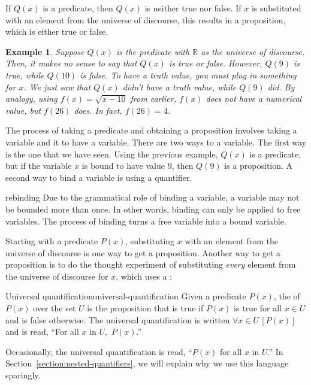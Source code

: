 \documentclass{book}
\newcounter{ekcounter}%
\theoremstyle{ekimcustom}
\newtheorem{example}[ekcounter]{Example}
\newcommand\defn[1]{{\color{blue}{\bf #1}}}
\begin{document}
If $Q(x)$ is a predicate, then $Q(x)$ is neither true nor false. If $x$ is substituted with an element from the universe of discourse, this results in a proposition, which is either true or false.
\begin{example}
Suppose $Q(x)$ is the predicate  with $\mathbb{R}$ as the universe of discourse. Then, it makes no sense to say that $Q(x)$ is true or false. However, $Q(9)$ is true, while $Q(10)$ is false. To have a truth value, you must plug in something for $x$. We just saw that $Q(x)$ didn't have a truth value, while $Q(9)$ did. By analogy, using $f(x)=\sqrt{x-10}$ from earlier, $f(x)$ does not have a numerical value, but $f(26)$ does. In fact, $f(26)=4$.
\end{example}

The process of taking a predicate and obtaining a proposition involves taking a \defn{free} variable and \defn{binding} it to have a \defn{bound} variable. There are two ways to \defn{bind} a variable. The first way is the one that we have seen. Using the previous example, $Q(x)$ is a predicate, but if the variable $x$ is bound to have value $9$, then $Q(9)$ is a proposition. A second way to bind a variable is using a quantifier.
\begin{bwarning}{}{rebinding}
Due to the grammatical role of binding a variable, a variable may not be bounded more than once. In other words, binding can only be applied to free variables. The process of binding turns a free variable into a bound variable.
\end{bwarning}
Starting with a predicate $P(x)$, substituting $x$ with an element from the universe of discourse is one way to get a proposition. Another way to get a proposition is to do the thought experiment of substituting \emph{every} element from the universe of discourse for $x$, which uses a \defn{quantifier}:
\begin{bdefinition}{Universal quantification}{universal-quantification}
Given a predicate $P(x)$, the \defn{universal quantification} of $P(x)$ over the set $U$ is the proposition that is true if $P(x)$ is true for all $x \in U$ and is false otherwise. The universal quantification is written $\forall x \in U\,[P(x)]$ and is read, ``For all $x$ in $U$,\, $P(x)$.''
\end{bdefinition}
Occasionally, the universal quantification is read, ``$P(x)$ for all $x$ in $U$.'' In Section~\ref{section:nested-quantifiers}, we will explain why we use this language sparingly.
\end{document}
